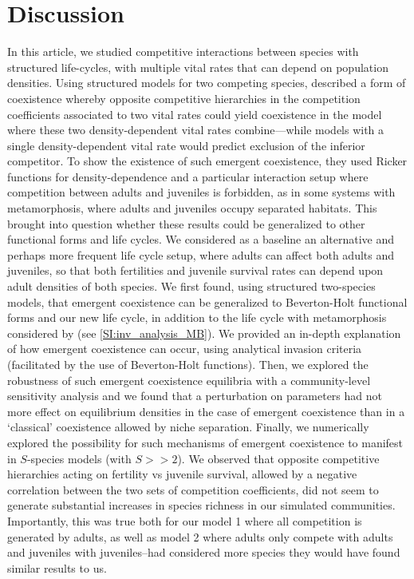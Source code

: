 \documentclass{article}
\begin{document}
\section{Discussion}
    
In this article, we studied competitive interactions between species with structured life-cycles, with multiple vital rates that can depend on population densities. Using structured models for two competing species, \citet{moll2008competition} described a form of coexistence whereby opposite competitive hierarchies in the competition coefficients associated to two vital rates could yield coexistence in the model where these two density-dependent vital rates combine---while models with a single density-dependent vital rate would predict exclusion of the inferior competitor. To show the existence of such emergent coexistence, they used Ricker functions for density-dependence and a particular interaction setup where competition between adults and juveniles is forbidden, as in some systems with metamorphosis, where adults and juveniles occupy separated habitats. This brought into question whether these results could be generalized to other functional forms and life cycles. We considered as a baseline an alternative and perhaps more frequent life cycle setup, where adults can affect both adults and juveniles, so that both fertilities and juvenile survival rates can depend upon adult densities of both species. We first found, using structured two-species models, that emergent coexistence can be generalized to Beverton-Holt functional forms and our new life cycle, in addition to the life cycle with metamorphosis considered by \citet{moll2008competition} (see \ref{SI:inv_analysis_MB}). We provided an in-depth explanation of how emergent coexistence can occur, using analytical invasion criteria (facilitated by the use of Beverton-Holt functions). Then, we explored the robustness of such emergent coexistence equilibria with a community-level sensitivity analysis and we found that a perturbation on parameters had not more effect on equilibrium densities in the case of emergent coexistence than in a `classical' coexistence allowed by niche separation. Finally, we numerically explored the possibility for such mechanisms of emergent coexistence to manifest in $S$-species models (with $S>>2$). We observed that opposite competitive hierarchies acting on fertility vs juvenile survival, allowed by a negative correlation between the two sets of competition coefficients, did not seem to generate substantial increases in species richness in our simulated communities. Importantly, this was true both for our model 1 where all competition is generated by adults, as well as model 2 where adults only compete with adults and juveniles with juveniles--had \citet{moll2008competition} considered more species they would have found similar results to us. \\
\end{document}

